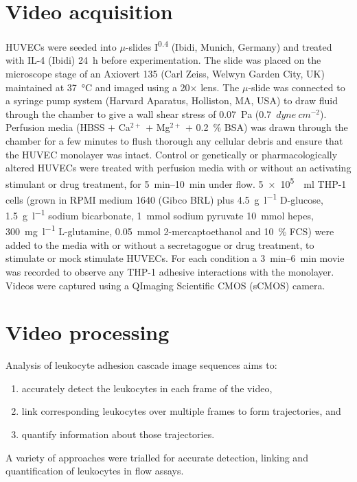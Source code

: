 \section{Video acquisition}
\label{leukocytes:acquisition}
HUVECs were seeded into $\mu$-slides I\textsuperscript{0.4} (Ibidi, Munich, Germany) and treated with IL-4 (Ibidi) \SI{24}{\hour} before experimentation. The slide was placed on the microscope stage of an Axiovert 135 (Carl Zeiss, Welwyn Garden City, UK) maintained at \SI{37}{\celsius} and imaged using a 20$\times$ lens. The $\mu$-slide was connected to a syringe pump system (Harvard Aparatus, Holliston, MA, USA) to draw fluid through the chamber to give a wall shear stress of \SI{0.07}{\pascal} (0.7~$dyne~cm^{-2}$). Perfusion media (HBSS $+$ Ca$^{2+}$ $+$ Mg$^{2+}$ $+$ 0.2~\% BSA) was drawn through the chamber for a few minutes to flush thorough any cellular debris and ensure that the HUVEC monolayer was intact. Control or genetically or pharmacologically  altered HUVECs were treated with perfusion media with or without an activating stimulant or drug treatment, for \SIrange{5}{10}{\minute} under flow. \SI{5e5}{\per\milli\litre} THP-1 cells (grown in RPMI medium 1640 (Gibco BRL) plus \SI{4.5}{\gram\per\litre} D-glucose, \SI{1.5}{\gram\per\litre} sodium bicarbonate, \SI{1}{\mmol} sodium pyruvate \SI{10}{\mmol} hepes, \SI{300}{\milli\gram\per\litre} L-glutamine, \SI{0.05}{\mmol} 2-mercaptoethanol and 10~\% FCS) were added to the media with or without a secretagogue or drug treatment, to stimulate or mock stimulate HUVECs. For each condition a \SIrange{3}{6}{\minute} movie was recorded to observe any THP-1 adhesive interactions with the monolayer. Videos were captured using a QImaging Scientific CMOS (sCMOS) camera.

\section{Video processing}
\label{leukocytes:processing}
Analysis of leukocyte adhesion cascade image sequences aims to:
\begin{enumerate}
\item accurately detect the leukocytes in each frame of the video, 
\item link corresponding leukocytes over multiple frames to form trajectories, and 
\item quantify information about those trajectories.
\end{enumerate}
A variety of approaches were trialled for accurate detection, linking and quantification of leukocytes in flow assays.

